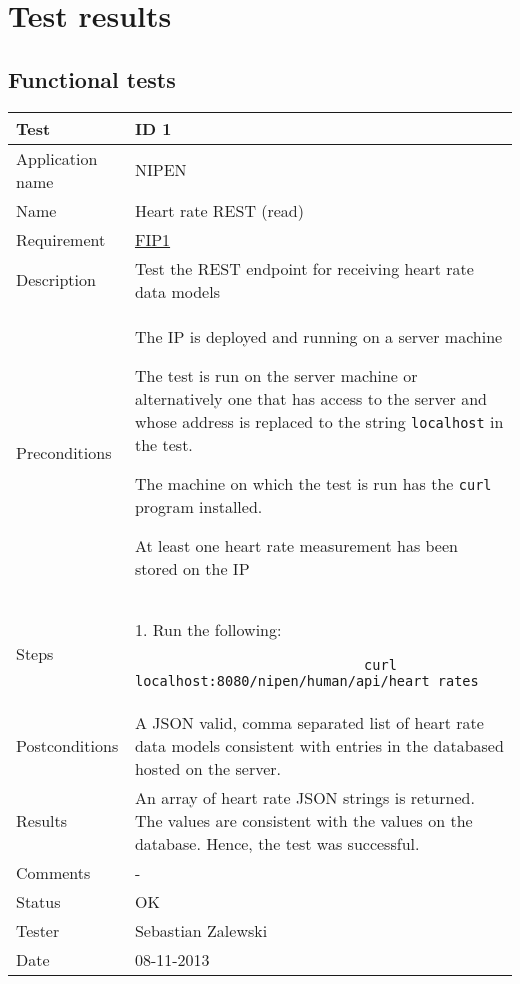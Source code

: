 \chapter{Test results}
\label{AppendixG}

\section{Functional tests}

\begin{table}
\begin{center}
\begin{tabular}{ | l | p{10cm} | }
	\hline
	\textbf{Test}	&	\textbf{ID 1} \\
	\hline\noalign{\smallskip}\noalign{\smallskip}\hline
	Application name	& NIPEN \\
	Name				& Heart rate REST (read) \\
	Requirement			& \hyperref[table:reqip]{FIP1} \\
	Description			& Test the REST endpoint for receiving heart rate data models \\
	Preconditions		& 	\par The IP is deployed and running on a server machine 
							\par The test is run on the server machine or alternatively
							one that has access to the server and whose address is replaced to the
							string \verb|localhost| in the test.
							\par The machine on which the test is run has the \verb|curl| program installed.
							\par At least one heart rate measurement has been stored on the IP \\
	Steps 				&	1. Run the following:
							\begin{verbatim}
							curl localhost:8080/nipen/human/api/heart_rates
							\end{verbatim}
							\\
	Postconditions		& A JSON valid, comma separated list of heart rate data models consistent with 
							entries in the databased hosted on the server. \\
	Results				& An array of heart rate JSON strings is returned. 
						  The values are consistent with the values on the database. 
						  Hence, the test was successful. \\
	Comments			& - \\
	Status				& OK \\
	Tester				& Sebastian Zalewski \\
	Date				& 08-11-2013 \\
	\hline
\end{tabular}
\end{center}
\end{table}

